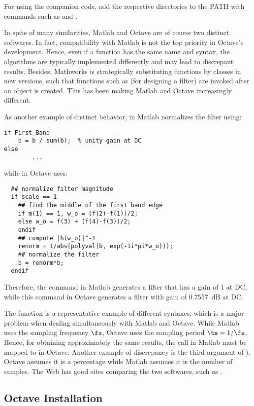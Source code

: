 For using the companion code, add the respective directories to the {\matlab} PATH with commands such as  and .

In spite of many similarities, Matlab and Octave are of course two distinct softwares. In fact, compatibility with Matlab is not the top priority in Octave's development. Hence, even if a function has the same name and syntax, the algorithms are typically implemented differently and may lead to discrepant results. Besides, Mathworks is strategically substituting functions by classes in new
versions, such that functions such as  (for designing a filter) are invoked after an
object is created. This has been making Matlab and Octave increasingly different.

As another example of distinct behavior,  in Matlab normalizes the filter using:
\begin{lstlisting}
if First_Band
    b = b / sum(b);  % unity gain at DC
else
		...
\end{lstlisting}
while  in Octave uses:
\begin{lstlisting}
  ## normalize filter magnitude
  if scale == 1
    ## find the middle of the first band edge
    if m(1) == 1, w_o = (f(2)-f(1))/2;
    else w_o = f(3) + (f(4)-f(3))/2;
    endif
    ## compute |h(w_o)|^-1
    renorm = 1/abs(polyval(b, exp(-1i*pi*w_o)));
    ## normalize the filter
    b = renorm*b;
  endif
\end{lstlisting}
Therefore, the command  in Matlab generates a filter that has a gain of 1 at DC, while this command in Octave generates a filter with gain of 0.7557~dB at DC.

The  function is a representative example of different syntaxes, which is a major problem when dealing simultaneously with Matlab and Octave. While Matlab uses the sampling frequency $\fs$, Octave uses the sampling period $\ts=1/\fs$. Hence, for obtaining approximately the same results, the call  in Matlab must be mapped to  in Octave.
Another example of discrepancy is the third argument of ). Octave assumes it is a percentage while Matlab assumes it is the number of samples.
The Web has good sites comparing the two softwares, such as .
\subsection{Octave Installation}

